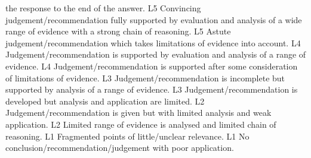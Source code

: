 \documentclass{article}
\begin{document}
the response to the end of the answer. \newline
 \newline
L5 \newline
Convincing judgement/recommendation fully supported by evaluation and analysis \newline
of a wide range of evidence with a strong chain of reasoning. \newline
 \newline
L5 \newline
Astute judgement/recommendation which takes limitations of evidence into account. \newline
 \newline
L4 \newline
Judgement/recommendation is supported by evaluation and analysis of a range of \newline
evidence. \newline
 \newline
L4 \newline
Judgement/recommendation is supported after some consideration of limitations of \newline
evidence. \newline
 \newline
L3 \newline
Judgement/recommendation is incomplete but supported by analysis of a range of \newline
evidence. \newline
 \newline
L3 \newline
Judgement/recommendation is developed but analysis and application are limited. \newline
 \newline
L2 \newline
Judgement/recommendation is given but with limited analysis and weak application. \newline
 \newline
L2 \newline
Limited range of evidence is analysed and limited chain of reasoning. \newline
 \newline
L1 \newline
Fragmented points of little/unclear relevance. \newline
 \newline
L1 \newline
No conclusion/recommendation/judgement with poor application. \newline
\end{document}
